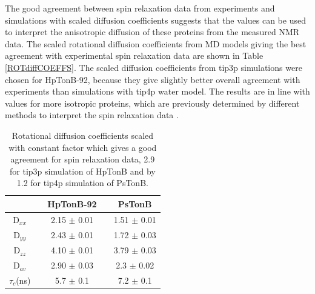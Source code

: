 \documentclass[pre,aps,floatfix,authordate1-4,twocolumn]{revtex4-1}
\begin{document}
The good agreement between spin relaxation data from experiments and
simulations with scaled diffusion coefficients suggests that the values
can be used to interpret the anisotropic diffusion of these proteins
from the measured NMR data. The scaled rotational diffusion coefficients
from MD models giving the best agreement with experimental spin relaxation
data are shown in Table \ref{ROTdiffCOEFFS}. The scaled diffusion coefficients
from tip3p simulations were chosen for HpTonB-92, because they give
slightly better overall agreement with experiments than simulations with
tip4p water model. The results are in line with values for more isotropic
proteins, which are previously determined by different methods to interpret
the spin relaxation data \cite{krishnan98}.
\begin{table}[!h]
  \centering
  \caption{Rotational diffusion coefficients scaled with constant factor which
    gives a good agreement for spin relaxation data,  2.9 for tip3p simulation of HpTonB
    and by 1.2 for tip4p simulation of PsTonB.}\label{ROTdiffCOEFFSscaled}
  \begin{tabular}{c c c c c}
    &    &  HpTonB-92  &  & PsTonB \\
    \hline
    D$_{xx}$    &   &   2.15 $\pm$ 0.01  & & 1.51  $\pm$ 0.01\\
    D$_{yy}$   &    &  2.43  $\pm$ 0.01  & & 1.72  $\pm$ 0.03\\
    D$_{zz}$   &    &  4.10   $\pm$ 0.01 & & 3.79  $\pm$ 0.03\\
    D$_{av}$  &    &   2.90  $\pm$ 0.03  & & 2.3  $\pm$ 0.02\\
    $\tau_{c}$(ns)  &    &  5.7   $\pm$ 0.1  & & 7.2 $\pm$ 0.1 \\
\end{tabular}
\end{table} 


  
\end{document}
